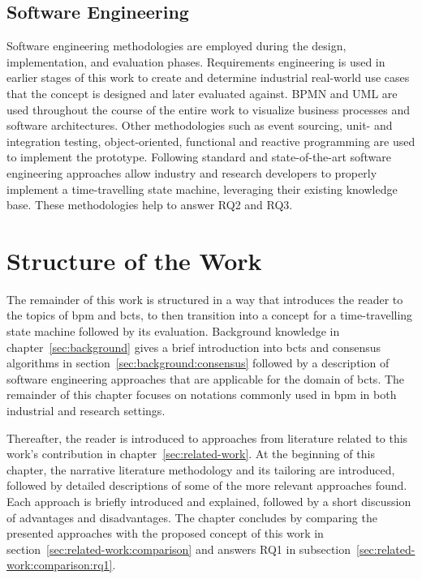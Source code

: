 \subsection{Software Engineering}
\label{sec:introduction:software_engineering}
Software engineering methodologies are employed during the design, implementation, and evaluation phases. Requirements engineering is used in earlier stages of this work to create and determine industrial real-world use cases that the concept is designed and later evaluated against. BPMN and UML are used throughout the course of the entire work to visualize business processes and software architectures. Other methodologies such as event sourcing, unit- and integration testing, object-oriented, functional and reactive programming are used to implement the prototype. Following standard and state-of-the-art software engineering approaches allow industry and research developers to properly implement a time-travelling state machine, leveraging their existing knowledge base. These methodologies help to answer RQ2 and RQ3.



\section{Structure of the Work}
\label{sec:introduction:structure_of_the_work}
The remainder of this work is structured in a way that introduces the reader to the topics of \gls{bpm} and \glspl{bct}, to then transition into a concept for a time-travelling state machine followed by its evaluation. Background knowledge in chapter~\ref{sec:background} gives a brief introduction into \glspl{bct} and consensus algorithms in section~\ref{sec:background:consensus} followed by a description of software engineering approaches that are applicable for the domain of \glspl{bct}. The remainder of this chapter focuses on notations commonly used in \gls{bpm} in both industrial and research settings.

Thereafter, the reader is introduced to approaches from literature related to this work's contribution in chapter~\ref{sec:related-work}. At the beginning of this chapter, the narrative literature methodology and its tailoring are introduced, followed by detailed descriptions of some of the more relevant approaches found. Each approach is briefly introduced and explained, followed by a short discussion of advantages and disadvantages. The chapter concludes by comparing the presented approaches with the proposed concept of this work in section~\ref{sec:related-work:comparison} and answers RQ1 in subsection~\ref{sec:related-work:comparison:rq1}.


